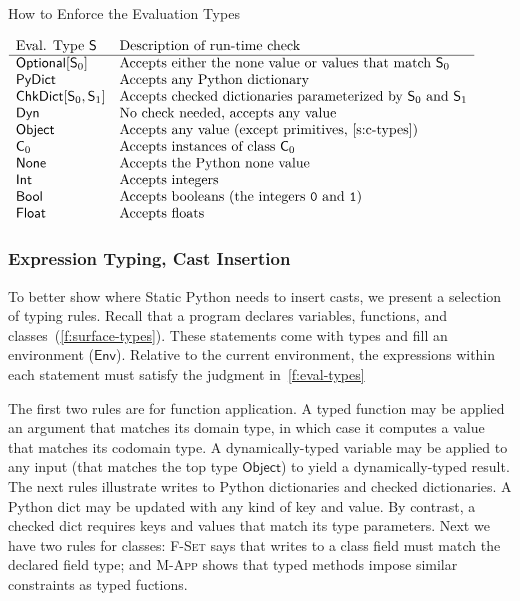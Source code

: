 \documentclass[english,cleveref,submission]{programming}
\newcommand{\SP}{Static Python}
\newcommand{\code}[1]{\texttt{#1}}
\newcommand{\typefont}[1]{\mathsf{#1}}
\newcommand{\paramtype}[2]{#1[#2]}
\newcommand{\spteval}{\typefont{S}}
\newcommand{\sptclass}{\typefont{C}}
\newcommand{\sptint}{\typefont{Int}}
\newcommand{\sptbool}{\typefont{Bool}}
\newcommand{\sptfloat}{\typefont{Float}}
\newcommand{\sptdyn}{\typefont{Dyn}}
\newcommand{\sptobject}{\typefont{Object}}
\newcommand{\sptnone}{\typefont{None}}
\newcommand{\sptoptional}[1]{\paramtype{\typefont{Optional}}{#1}}
\newcommand{\sptrawpydict}{\typefont{PyDict}}
\newcommand{\sptchkdict}[2]{\paramtype{\typefont{ChkDict}}{#1, #2}}
\newcommand{\sptenv}{\typefont{Env}}
\newcommand{\trule}[1]{\textsc{#1}}
\begin{document}
\begin{table}[t]
  \caption{How to Enforce the Evaluation Types}
  \label{t:cast}

  \(\begin{array}{l@{\quad}l}
    \mbox{Eval. Type $\spteval$} & \mbox{Description of run-time check} \\\hline
    \sptoptional{\spteval_0} & \mbox{Accepts either the none value or values that match $\spteval_0$} \\
    \sptrawpydict & \mbox{Accepts any Python dictionary} \\
    \sptchkdict{\spteval_0}{\spteval_1} & \mbox{Accepts checked dictionaries parameterized by $\spteval_0$ and $\spteval_1$} \\
    \sptdyn & \mbox{No check needed, accepts any value} \\
    \sptobject & \mbox{Accepts any value (except primitives,~\cref{s:c-types})} \\
    \sptclass_0 & \mbox{Accepts instances of class $\sptclass_0$} \\
    \sptnone & \mbox{Accepts the Python none value} \\
    \sptint & \mbox{Accepts integers} \\
    \sptbool & \mbox{Accepts booleans (the integers \code{0} and \code{1})} \\
    \sptfloat & \mbox{Accepts floats}
  \end{array}\)
\end{table}


\subsubsection{Expression Typing, Cast Insertion}

To better show where \SP{} needs to insert casts, we present a selection of typing rules.
Recall that a program declares variables, functions, and classes~(\cref{f:surface-types}).
These statements come with types and fill an environment ($\sptenv$).
Relative to the current environment, the expressions within each statement must
satisfy the judgment in~\cref{f:eval-types} 

The first two rules are for function application.
A typed function may be applied an argument that matches its domain type,
in which case it computes a value that matches its codomain type.
A dynamically-typed variable may be applied to any input (that matches the top
type $\sptobject$) to yield a dynamically-typed result.
The next rules illustrate writes to Python dictionaries and checked dictionaries.
A Python dict may be updated with any kind of key and value.
By contrast, a checked dict requires keys and values that match its type parameters.
Next we have two rules for classes:
\trule{F-Set} says that writes to a class field must match the declared field
type; and \trule{M-App} shows that typed methods impose similar constraints as
typed fuctions.
\end{document}
